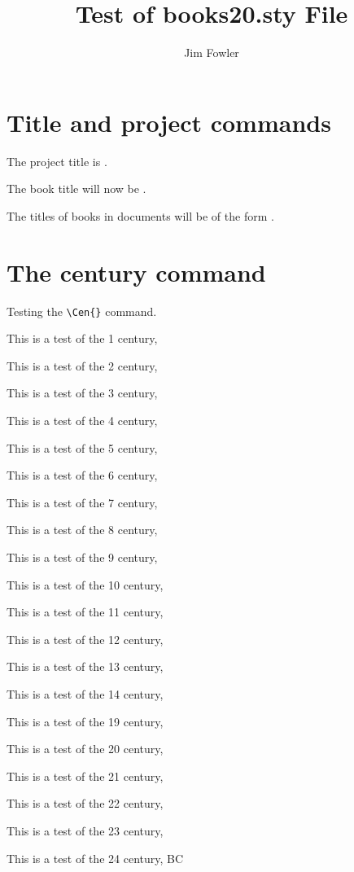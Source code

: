 \documentclass{article}
\begin{document}
\title{Test of books20.sty File}
\author{Jim Fowler}

\maketitle

\section{Title and project commands}

The project title is \ProjectTitle.

The book title will now be \BookTitle.

The titles of books in documents will be of the form .

\section{The century command}

Testing the \verb|\Cen{}| command.

This is a test of the 1 century, 

This is a test of the 2 century, 

This is a test of the 3 century, 

This is a test of the 4 century, 

This is a test of the 5 century, 

This is a test of the 6 century, 

This is a test of the 7 century, 

This is a test of the 8 century, 

This is a test of the 9 century, 

This is a test of the 10 century, 

This is a test of the 11 century, 

This is a test of the 12 century, 

This is a test of the 13 century, 

This is a test of the 14 century, 

This is a test of the 19 century, 

This is a test of the 20 century, 

This is a test of the 21 century, 

This is a test of the 22 century, 

This is a test of the 23 century, 

This is a test of the 24 century,  BC
\end{document}
